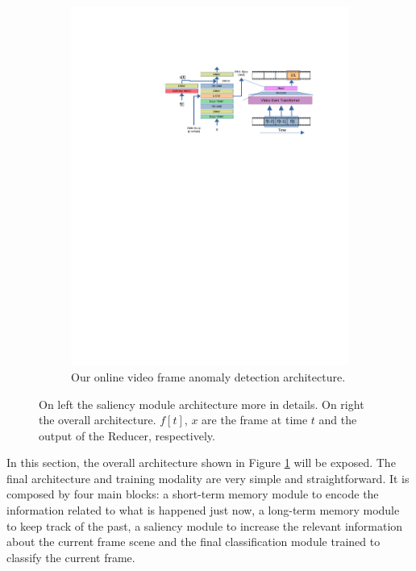 \begin{figure}[!ht]
\begin{subfigure}{0.7\linewidth}
            \includegraphics[trim=205 500 80 130, clip, width=1.\linewidth]{images/arch.pdf}
        \caption{Our online video frame anomaly detection architecture.}
		\label{fig:arch}
	\end{subfigure}
	\caption{On left the saliency module architecture more in details. On right the overall architecture. $f[t]$, $x$ are the frame at time $t$ and the output of the Reducer, respectively.}
	\label{fig:our-arch}
\end{figure}

In this section, the overall architecture shown in Figure \ref{fig:arch} will be exposed.
The final architecture and training modality are very simple and straightforward.
It is composed by four main blocks: a short-term memory module to encode the information related to what is happened just now, a long-term memory module to keep track of the past, a saliency module to increase the relevant information about the current frame scene and the final classification module trained to classify the current frame.


